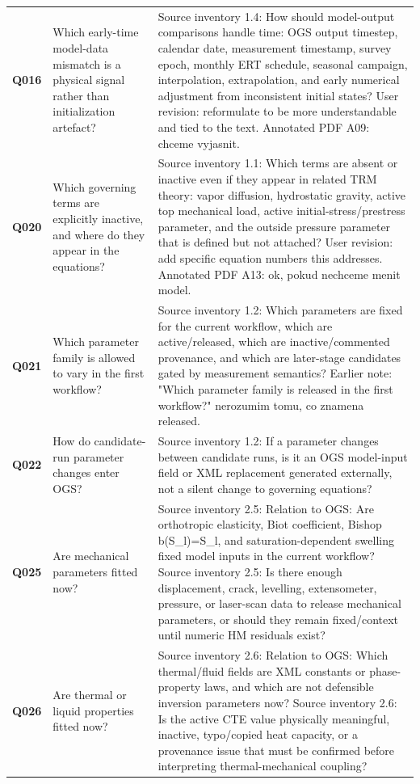 \begin{longtable}{@{}L{0.10\textwidth} L{0.30\textwidth} L{0.52\textwidth}@{}}
\addlinespace[0.22em]
\textbf{Q016} & Which early-time model-data mismatch is a physical signal rather than initialization artefact? & Source inventory 1.4: How should model-output comparisons handle time: OGS output timestep, calendar date, measurement timestamp, survey epoch, monthly ERT schedule, seasonal campaign, interpolation, extrapolation, and early numerical adjustment from inconsistent initial states? User revision: reformulate to be more understandable and tied to the text. Annotated PDF A09: chceme vyjasnit.\\
\addlinespace[0.22em]
\textbf{Q020} & Which governing terms are explicitly inactive, and where do they appear in the equations? & Source inventory 1.1: Which terms are absent or inactive even if they appear in related TRM theory: vapor diffusion, hydrostatic gravity, active top mechanical load, active initial-stress/prestress parameter, and the outside pressure parameter that is defined but not attached? User revision: add specific equation numbers this addresses. Annotated PDF A13: ok, pokud nechceme menit model.\\
\addlinespace[0.22em]
\textbf{Q021} & Which parameter family is allowed to vary in the first workflow? & Source inventory 1.2: Which parameters are fixed for the current workflow, which are active/released, which are inactive/commented provenance, and which are later-stage candidates gated by measurement semantics? Earlier note: "Which parameter family is released in the first workflow?" nerozumim tomu, co znamena released.\\
\addlinespace[0.22em]
\textbf{Q022} & How do candidate-run parameter changes enter OGS? & Source inventory 1.2: If a parameter changes between candidate runs, is it an OGS model-input field or XML replacement generated externally, not a silent change to governing equations?\\
\addlinespace[0.22em]
\textbf{Q025} & Are mechanical parameters fitted now? & Source inventory 2.5: Relation to OGS: Are orthotropic elasticity, Biot coefficient, Bishop b(S\_l)=S\_l, and saturation-dependent swelling fixed model inputs in the current workflow? Source inventory 2.5: Is there enough displacement, crack, levelling, extensometer, pressure, or laser-scan data to release mechanical parameters, or should they remain fixed/context until numeric HM residuals exist?\\
\addlinespace[0.22em]
\textbf{Q026} & Are thermal or liquid properties fitted now? & Source inventory 2.6: Relation to OGS: Which thermal/fluid fields are XML constants or phase-property laws, and which are not defensible inversion parameters now? Source inventory 2.6: Is the active CTE value physically meaningful, inactive, typo/copied heat capacity, or a provenance issue that must be confirmed before interpreting thermal-mechanical coupling?\\

\end{longtable}
